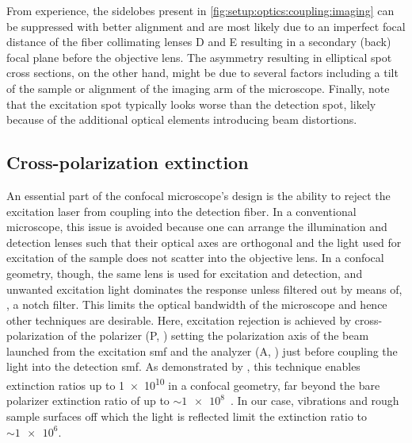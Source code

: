 From experience, the sidelobes present in \cref{fig:setup:optics:coupling:imaging} can be suppressed with better alignment and are most likely due to an imperfect focal distance of the fiber collimating lenses D and E resulting in a secondary (back) focal plane before the objective lens.
The asymmetry resulting in elliptical spot cross sections, on the other hand, might be due to several factors including a tilt of the sample or alignment of the imaging arm of the microscope.
Finally, note that the excitation spot typically looks worse than the detection spot, likely because of the additional optical elements introducing beam distortions.

\subsection{Cross-polarization extinction}\label{subsec:setup:optics:coupling:rejection}
An essential part of the confocal microscope's design is the ability to reject the excitation laser from coupling into the detection fiber.
In a conventional microscope, this issue is avoided because one can arrange the illumination and detection lenses such that their optical axes are orthogonal and the light used for excitation of the sample does not scatter into the objective lens.
In a confocal geometry, though, the same lens is used for excitation and detection, and unwanted excitation light dominates the response unless filtered out by means of, \eg, a notch filter.
This limits the optical bandwidth of the microscope and hence other techniques are desirable.
Here, excitation rejection is achieved by cross-polarization of the polarizer (P, \polarizer) setting the polarization axis of the beam launched from the excitation \gls{smf} and the analyzer (A, \polarizer) just before coupling the light into the detection \gls{smf}.
As demonstrated by \textcite{Benelajla2021}, this technique enables extinction ratios
up to \num{1e10} in a confocal geometry, far beyond the bare polarizer extinction ratio of up to $\sim\num{1e8}$~\cite{ThorlabsLPVIS050-MP2}.
In our case, vibrations and rough sample surfaces off which the light is reflected limit the extinction ratio to $\sim\num{1e6}$.

